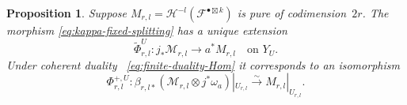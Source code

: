 \documentclass[11pt,letterpaper]{amsart}
\theoremstyle{plain}
\newtheorem{proposition}[theorem]{Proposition}
\theoremstyle{definition}
\theoremstyle{remark}
\numberwithin{equation}{section}
\begin{document}
\begin{proposition}\label{prop:split-comparison}
Suppose $M_{r,l}=\mathcal H^{-l}(\mathcal F^{\bullet\boxtimes k})$
is pure of codimension~$2r$.  The morphism
\eqref{eq:kappa-fixed-splitting} has a unique extension
\begin{equation}\label{eq:split-comparison}
 \widetilde\Phi^U_{r,l}:j_*\mathscr M_{r,l}
                      \longrightarrow a^*M_{r,l}
 \quad\text{on }Y_U.
 \end{equation}
Under coherent duality ~\eqref{eq:finite-duality-Hom} it corresponds to an isomorphism
\begin{equation}\label{eq:Phi-U}
 \Phi^{+,U}_{r,l}:
 \beta_{r,l*}(\mathscr M_{r,l}\otimes j^*\omega_a)|_{U_{r,l}}
                       \xrightarrow{\sim}M_{r,l}|_{U_{r,l}}.
\end{equation}
\end{proposition}
\end{document}
